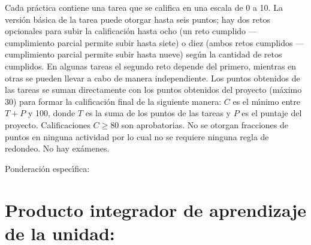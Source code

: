 \documentclass[10 pt]{article}
\begin{document}
  Cada pr\'{a}ctica contiene una tarea que se califica en una escala de 0
  a 10. La versi\'{o}n b\'{a}sica de la tarea puede otorgar hasta seis puntos;
  hay dos retos opcionales para subir la calificaci\'{o}n hasta ocho (un
  reto cumplido --- cumplimiento parcial permite subir hasta siete) o
  diez (ambos retos cumplidos --- cumplimiento parcial permite subir
  hasta nueve) seg\'{u}n la cantidad de retos cumplidos. En algunas tareas
  el segundo reto depende del primero, mientras en otras se pueden
  llevar a cabo de manera independiente.  Los puntos obtenidos de las
  tareas se suman directamente con los puntos obtenidos del proyecto
  (m\'{a}ximo 30) para formar la calificaci\'{o}n final de la siguiente
  manera: $C$ es el m\'{\i}nimo entre $T + P$ y 100, donde $T$ es la suma
  de los puntos de las tareas y $P$ es el puntaje del proyecto.
  Calificaciones $C \geq 80$ son aprobatorias. No se otorgan
  fracciones de puntos en ninguna actividad por lo cual no se requiere
  ninguna regla de redondeo. No hay ex\'{a}menes.
  
  Ponderaci\'{o}n espec\'{\i}fica:

  
  \newpage

\section{Producto integrador de aprendizaje de la unidad:}
\end{document}
